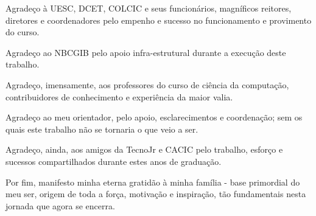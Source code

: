 	Agradeço à UESC, DCET, COLCIC e seus funcionários, magníficos reitores, diretores e coordenadores pelo empenho e sucesso no funcionamento e provimento do curso.

	Agradeço ao NBCGIB pelo apoio infra-estrutural durante a execução deste trabalho.
	
	Agradeço, imensamente, aos professores do curso de ciência da computação, contribuidores de conhecimento e experiência da maior valia.
	
	Agradeço ao meu orientador, pelo apoio, esclarecimentos e coordenação; sem os quais este trabalho não se tornaria o que veio a ser.
	
	Agradeço, ainda, aos amigos da TecnoJr e CACIC pelo trabalho, esforço e sucessos compartilhados durante estes anos de graduação.
	
	Por fim, manifesto minha eterna gratidão à minha família - base primordial do meu ser, origem de toda a força, motivação e inspiração, tão fundamentais nesta jornada que agora se encerra.
